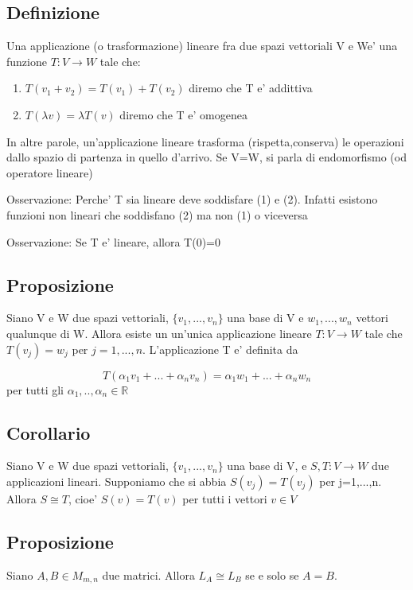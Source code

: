 \documentclass{article}
\begin{document}
\subsection{Definizione}
\begin{flushleft}
	Una applicazione (o trasformazione) lineare fra due spazi vettoriali V e We' una funzione
	$T: V \to W$ tale che:
\end{flushleft}
\begin{enumerate}
	\item $T(v_1+v_2)=T(v_1)+T(v_2)$ diremo che T e' addittiva
	\item $T(\lambda v)=\lambda T(v)$ diremo che T e' omogenea
\end{enumerate}
\begin{flushleft}
	In altre parole, un'applicazione lineare trasforma (rispetta,conserva) le operazioni dallo spazio di partenza
	in quello d'arrivo. Se V=W, si parla di endomorfismo (od operatore lineare)
\end{flushleft}
\begin{flushleft}
	Osservazione: Perche' T sia lineare deve soddisfare (1) e (2). Infatti esistono funzioni non lineari che soddisfano (2) ma non (1)
	o viceversa
\end{flushleft}
\begin{flushleft}
	Osservazione: Se T e' lineare, allora T(0)=0
\end{flushleft}
\subsection{Proposizione}
\begin{flushleft}
	Siano V e W due spazi vettoriali, $\{v_1,...,v_n \}$ una base di V e $w_1,...,w_n$ vettori qualunque di W.
	Allora esiste un un'unica applicazione lineare $T: V \to W$ tale che $T(v_j)=w_j$ per $j=1,...,n$. L'applicazione T e' definita da
\end{flushleft}
\begin{equation*}
	T(\alpha_1 v_1+...+\alpha_n v_n)=\alpha_1 w_1+...+\alpha_n w_n
\end{equation*}
per tutti gli $\alpha_1,..,\alpha_n \in \mathbb{R}$
\subsection{Corollario}
\begin{flushleft}
	Siano V e W due spazi vettoriali, $\{ v_1,...,v_n \}$ una base di V, e $S,T:V\to W$ due applicazioni lineari.
	Supponiamo che si abbia $S(v_j)=T(v_j)$ per j=1,...,n. Allora $S \cong T$, cioe' $S(v)=T(v)$ per tutti i vettori $v \in V$
\end{flushleft}
\subsection{Proposizione}
Siano $A,B \in M_{m,n}$ due matrici. Allora $L_A \cong L_B$ se e solo se $A=B$.
\end{document}
